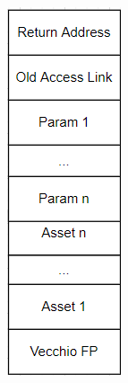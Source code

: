\documentclass[12pt, a4paper]{report}
\begin{document}
\begin{figure}
    \includegraphics[width=0.9\linewidth]{RdA.png}
    \centering
\end{figure}
\end{document}
